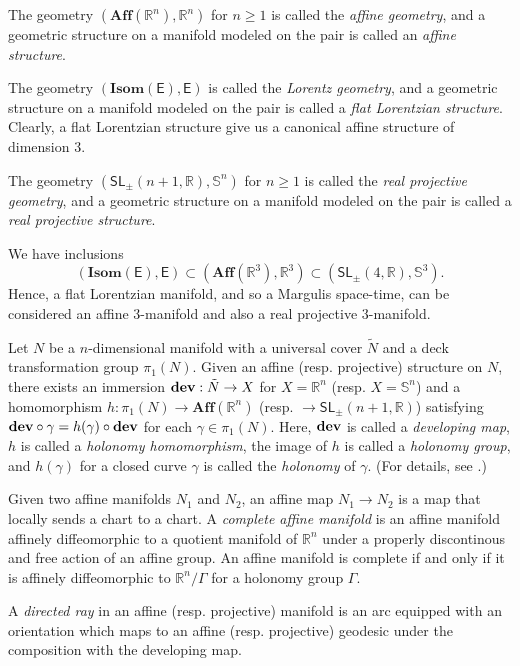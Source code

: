 \documentclass{amsart}
\numberwithin{equation}{section}
\newcommand\bR{{\mathbb{R}}}
\newcommand\dev{{\bf dev}}
\newcommand\SI{{\mathbb{S}}}
\newcommand\ra{\rightarrow}
\newcommand\Aff{{\mathbf{Aff}}}
\newcommand\Isom{{\mathbf{Isom}}}
\newcommand\SL{{\mathsf{SL}}}
\newcommand\Lspace{\mathsf E}
\theoremstyle{definition}
\theoremstyle{remark}
\begin{document}
The geometry $(\Aff(\bR^n), \bR^n)$ for $n \geq 1$ is 
called the {\em affine geometry}, and a geometric structure on a manifold modeled on
the pair is called an {\em affine structure}. 

The geometry $(\Isom(\Lspace), \Lspace)$ is 
called the {\em Lorentz geometry}, and a geometric structure on a manifold modeled on
the pair is called a {\em flat Lorentzian structure}. Clearly, a flat Lorentzian structure 
give us a canonical affine structure of dimension $3$.  

The geometry $(\SL_\pm(n+1, \bR), \SI^n)$ for $n\geq 1$ 
is called the {\em real projective geometry},
and a geometric structure on a manifold modeled 
on the pair is called a {\em real projective structure}. 

We have inclusions
\[        
(\Isom(\Lspace), \Lspace)\subset (\Aff(\bR^3), \bR^3)
\subset (\SL_\pm(4, \bR), \SI^3).
\]
Hence, a flat Lorentzian manifold, and so a Margulis space-time, 
can be considered an affine $3$-manifold 
and also a real projective $3$-manifold. 

Let $N$ be a $n$-dimensional 
manifold with a universal cover $\tilde N$ and a deck transformation 
group $\pi_1(N)$. 
Given an affine (resp. projective) structure on $N$, there exists an immersion 
$\dev: \tilde N \ra X$ for $X = \bR^n$ (resp. $X= \SI^n$) and a homomorphism 
$h: \pi_1(N) \ra \Aff(\bR^n)$ (resp. $\ra \SL_\pm(n+1, \bR)$) satisfying 
$\dev \circ \gamma = h(\gamma) \circ \dev$ for each $\gamma \in \pi_1(N)$. 
Here, $\dev$ is called a {\em developing map}, 
$h$ is called a {\em holonomy homomorphism}, the image of $h$ is 
called a {\em holonomy group}, and $h(\gamma)$ for a closed curve 
$\gamma$ is called the {\em holonomy} of $\gamma$. 
(For details, see \cite{psconv}.) 

Given two affine manifolds $N_1$ and $N_2$, 
an affine map $N_1 \ra N_2$ is a map that locally sends a chart to a chart. 
A {\em complete affine manifold} is an affine manifold 
affinely diffeomorphic to a quotient manifold of $\bR^n$ under a properly discontinous and free action 
of an affine group. An affine manifold is complete if and only if 
it is affinely diffeomorphic to $\bR^n/\Gamma$ for a holonomy group $\Gamma$.

A {\em directed ray} in an affine (resp. projective) manifold is an arc
equipped with an orientation which maps to an affine (resp. projective) geodesic under the composition with the developing map. 
\end{document}
